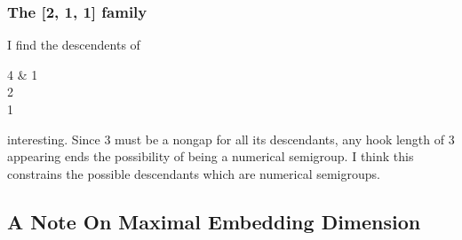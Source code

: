 \begin{landscape}
\begin{center}
\end{center}
\end{landscape}

\subsubsection{The [2, 1, 1] family}

I find the descendents of {\tiny \begin{ytableau} 4 & 1 \\ 2 \\ 1 \end{ytableau}} interesting. Since \(3\) must be a nongap for all its descendants, any hook length of 3 appearing ends the possibility of being a numerical semigroup. I think this constrains the possible descendants which are numerical semigroups.


\subsection{A Note On Maximal Embedding Dimension}

